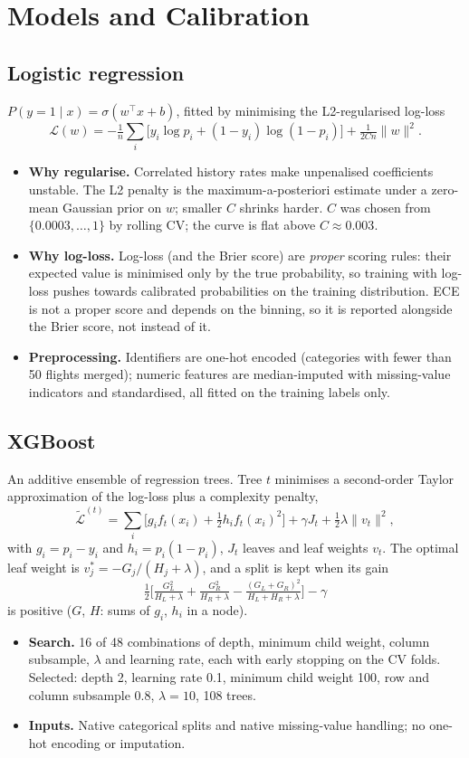 \documentclass[conference]{IEEEtran}
\begin{document}
\section{Models and Calibration}\label{sec:models}
\subsection{Logistic regression}
$P(y=1\mid x)=\sigma(w^\top x+b)$, fitted by minimising the L2-regularised log-loss
\[
\mathcal{L}(w)=-\tfrac1n\textstyle\sum_i\big[y_i\log p_i+(1-y_i)\log(1-p_i)\big]+\tfrac{1}{2Cn}\lVert w\rVert^2 .
\]
\begin{itemize}
\item \textbf{Why regularise.} Correlated history rates make unpenalised coefficients unstable. The L2 penalty is the maximum-a-posteriori estimate under a zero-mean Gaussian prior on $w$; smaller $C$ shrinks harder. $C$ was chosen from $\{0.0003,\dots,1\}$ by rolling CV; the curve is flat above $C\approx0.003$.
\item \textbf{Why log-loss.} Log-loss (and the Brier score) are \emph{proper} scoring rules: their expected value is minimised only by the true probability, so training with log-loss pushes towards calibrated probabilities on the training distribution. ECE is not a proper score and depends on the binning, so it is reported alongside the Brier score, not instead of it.
\item \textbf{Preprocessing.} Identifiers are one-hot encoded (categories with fewer than 50 flights merged); numeric features are median-imputed with missing-value indicators and standardised, all fitted on the training labels only.
\end{itemize}

\subsection{XGBoost}
An additive ensemble of regression trees. Tree $t$ minimises a second-order Taylor approximation of the log-loss plus a complexity penalty,
\[
\tilde{\mathcal L}^{(t)}=\textstyle\sum_i\big[g_if_t(x_i)+\tfrac12h_if_t(x_i)^2\big]+\gamma J_t+\tfrac12\lambda\lVert v_t\rVert^2 ,
\]
with $g_i=p_i-y_i$ and $h_i=p_i(1-p_i)$, $J_t$ leaves and leaf weights $v_t$. The optimal leaf weight is $v_j^*=-G_j/(H_j+\lambda)$, and a split is kept when its gain
\[
\tfrac12\Big[\tfrac{G_L^2}{H_L+\lambda}+\tfrac{G_R^2}{H_R+\lambda}-\tfrac{(G_L+G_R)^2}{H_L+H_R+\lambda}\Big]-\gamma
\]
is positive ($G$, $H$: sums of $g_i$, $h_i$ in a node).
\begin{itemize}
\item \textbf{Search.} 16 of 48 combinations of depth, minimum child weight, column subsample, $\lambda$ and learning rate, each with early stopping on the CV folds. Selected: depth 2, learning rate 0.1, minimum child weight 100, row and column subsample 0.8, $\lambda=10$, 108 trees.
\item \textbf{Inputs.} Native categorical splits and native missing-value handling; no one-hot encoding or imputation.
\end{itemize}
\end{document}
